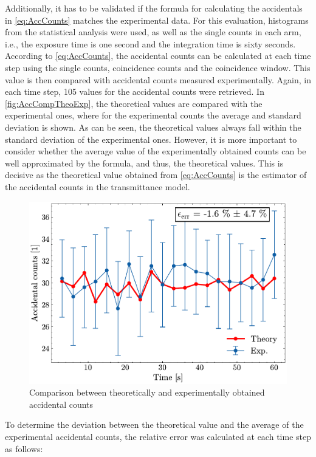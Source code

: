Additionally, it has to be validated if the formula for calculating the accidentals in \autoref{eq:AccCounts} matches the experimental data. For this evaluation, histograms from the statistical analysis were used, as well as the single counts in each arm, i.e., the exposure time is one second and the integration time is sixty seconds. \newline
According to \autoref{eq:AccCounts}, the accidental counts can be calculated at each time step using the single counts, coincidence counts and the coincidence window. This value is then compared with accidental counts measured experimentally. Again, in each time step, 105 values for the accidental counts were retrieved. In \autoref{fig:AccCompTheoExp}, the theoretical values are compared with the experimental ones, where for the experimental counts the average and standard deviation is shown. \newline
As can be seen, the theoretical values always fall within the standard deviation of the experimental ones. However, it is more important to consider whether the average value of the experimentally obtained counts can be well approximated by the formula, and thus, the theoretical values. This is decisive as the theoretical value obtained from \autoref{eq:AccCounts} is the estimator of the accidental counts in the transmittance model. 
\begin{figure}[tb!]
	\centering
	\includegraphics[width=.8\textwidth]{Images/AccCountsTheoExpStep4_2.pdf}
	\caption{Comparison between theoretically and experimentally obtained accidental counts}
	\label{fig:AccCompTheoExp}
\end{figure}\newline
To determine the deviation between the theoretical value and the average of the experimental accidental counts, the relative error was calculated at each time step as follows:
